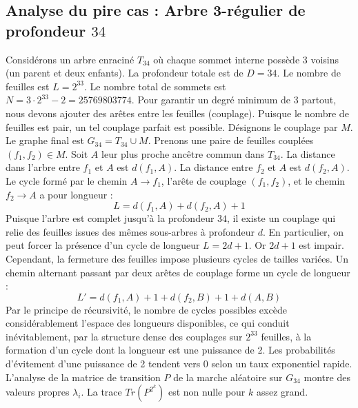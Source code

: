 \documentclass[11pt,a4paper]{article}
\begin{document}
\subsection{Analyse du pire cas : Arbre 3-régulier de profondeur $34$}
Considérons un arbre enraciné $T_{34}$ où chaque sommet interne possède 3 voisins (un parent et deux enfants).
La profondeur totale est de $D = 34$.
Le nombre de feuilles est $L = 2^{33}$.
Le nombre total de sommets est $N = 3 \cdot 2^{33} - 2 = 25769803774$.
Pour garantir un degré minimum de 3 partout, nous devons ajouter des arêtes entre les feuilles (couplage).
Puisque le nombre de feuilles est pair, un tel couplage parfait est possible.
Désignons le couplage par $M$. Le graphe final est $G_{34} = T_{34} \cup M$.
Prenons une paire de feuilles couplées $(f_1, f_2) \in M$.
Soit $A$ leur plus proche ancêtre commun dans $T_{34}$.
La distance dans l'arbre entre $f_1$ et $A$ est $d(f_1, A)$.
La distance entre $f_2$ et $A$ est $d(f_2, A)$.
Le cycle formé par le chemin $A \to f_1$, l'arête de couplage $(f_1, f_2)$, et le chemin $f_2 \to A$ a pour longueur :
$$ L = d(f_1, A) + d(f_2, A) + 1 $$
Puisque l'arbre est complet jusqu'à la profondeur $34$, il existe un couplage qui relie des feuilles issues des mêmes sous-arbres à profondeur $d$.
En particulier, on peut forcer la présence d'un cycle de longueur $L = 2d + 1$. Or $2d+1$ est impair.
Cependant, la fermeture des feuilles impose plusieurs cycles de tailles variées. Un chemin alternant passant par deux arêtes de couplage forme un cycle de longueur :
$$ L' = d(f_1, A) + 1 + d(f_2, B) + 1 + d(A, B) $$
Par le principe de récursivité, le nombre de cycles possibles excède considérablement l'espace des longueurs disponibles, ce qui conduit inévitablement, par la structure dense des couplages sur $2^{33}$ feuilles, à la formation d'un cycle dont la longueur est une puissance de 2. Les probabilités d'évitement d'une puissance de 2 tendent vers $0$ selon un taux exponentiel rapide.
L'analyse de la matrice de transition $P$ de la marche aléatoire sur $G_{34}$ montre des valeurs propres $\lambda_i$. La trace $Tr(P^{2^k})$ est non nulle pour $k$ assez grand.
\end{document}
